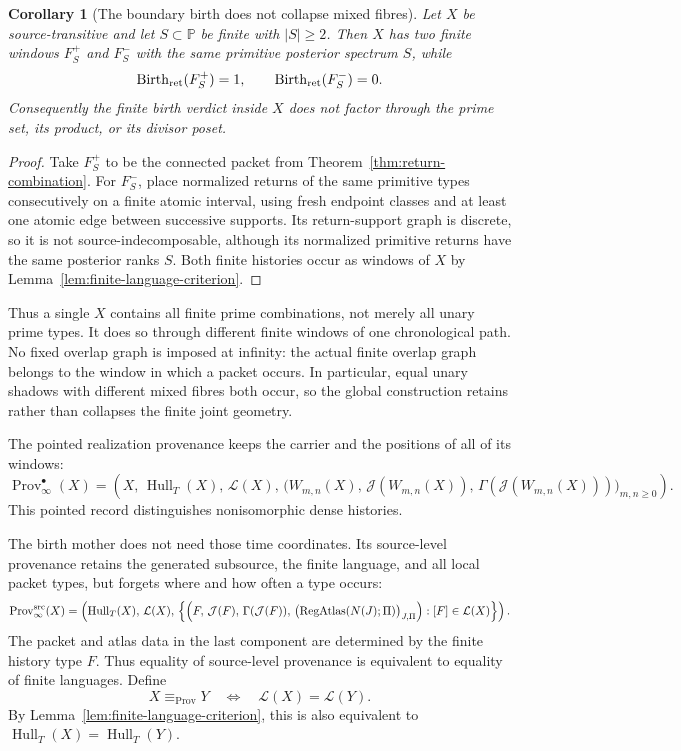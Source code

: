 \documentclass[11pt]{article}
\newtheorem{corollary}[theorem]{Corollary}
\newcommand{\RegAtlas}{\operatorname{RegAtlas}}
\newcommand{\Birth}{\operatorname{Birth}}
\newcommand{\Prov}{\operatorname{Prov}}
\begin{document}
\begin{corollary}[The boundary birth does not collapse mixed fibres]
\label{cor:boundary-mixed-fibres}
Let \(X\) be source-transitive and let
\(S\subset\mathbb P\) be finite with \(|S|\ge2\).  Then \(X\) has two finite
windows \(F_S^+\) and \(F_S^-\) with the same primitive posterior spectrum
\(S\), while
\[
\Birth_{\rm ret}(F_S^+)=1,
\qquad
\Birth_{\rm ret}(F_S^-)=0.
\]
Consequently the finite birth verdict inside \(X\) does not factor through
the prime set, its product, or its divisor poset.
\end{corollary}

\begin{proof}
Take \(F_S^+\) to be the connected packet from
Theorem~\ref{thm:return-combination}.  For \(F_S^-\), place normalized returns
of the same primitive types consecutively on a finite atomic interval, using
fresh endpoint classes and at least one atomic edge between successive
supports.  Its return-support graph is discrete, so it is not
source-indecomposable, although its normalized primitive returns have the same
posterior ranks \(S\).  Both finite histories occur as windows of \(X\) by
Lemma~\ref{lem:finite-language-criterion}.
\end{proof}

Thus a single \(X\) contains all finite prime combinations, not merely all
unary prime types.  It does so through different finite windows of one
chronological path.  No fixed overlap graph is imposed at infinity: the
actual finite overlap graph belongs to the window in which a packet occurs.
In particular, equal unary shadows with different mixed fibres both occur,
so the global construction retains rather than collapses the finite joint
geometry.

The pointed realization provenance keeps the carrier and the positions of all
of its windows:
\[
\Prov^\bullet_\infty(X)
=
\left(
 X,\,
 \operatorname{Hull}_T(X),\,
 \mathcal L(X),\,
 \bigl(
   W_{m,n}(X),\,
   \mathcal J(W_{m,n}(X)),\,
   \Gamma(\mathcal J(W_{m,n}(X)))
 \bigr)_{m,n\ge0}
\right).
\]
This pointed record distinguishes nonisomorphic dense histories.

The birth mother does not need those time coordinates.  Its source-level
provenance retains the generated subsource, the finite language, and all local
packet types, but forgets where and how often a type occurs:
\[
\Prov^{\rm src}_\infty(X)
=
\left(
 \operatorname{Hull}_T(X),\,
 \mathcal L(X),\,
 \left\{
 \left(
   F,\,
   \mathcal J(F),\,
   \Gamma(\mathcal J(F)),\,
   \bigl(\RegAtlas(N(J);\Pi)\bigr)_{J,\Pi}
 \right):
 [F]\in\mathcal L(X)
 \right\}
\right).
\]
The packet and atlas data in the last component are determined by the finite
history type \(F\).  Thus equality of source-level provenance is equivalent to
equality of finite languages.  Define
\[
X\equiv_{\Prov}Y
\quad\Longleftrightarrow\quad
\mathcal L(X)=\mathcal L(Y).
\]
By Lemma~\ref{lem:finite-language-criterion}, this is also equivalent to
\(\operatorname{Hull}_T(X)=\operatorname{Hull}_T(Y)\).
\end{document}
